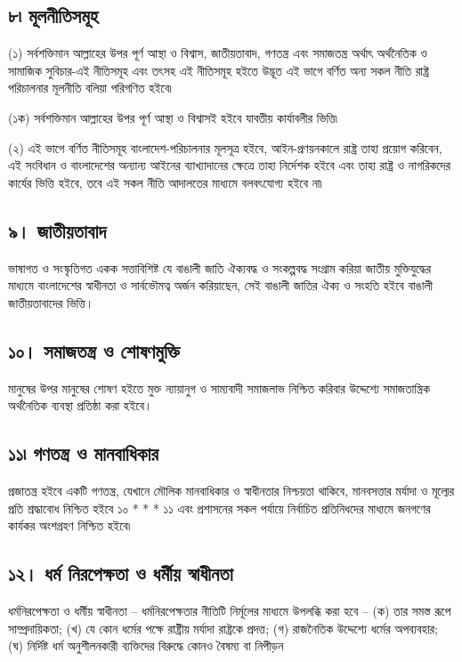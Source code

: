 \documentclass[11pt]{article}
\begin{document}
\subsection{৮৷ মূলনীতিসমূহ}
\label{sec:orgee61473}
(১) সর্বশক্তিমান আল্লাহের উপর পূর্ণ আস্থা ও বিশ্বাস, জাতীয়তাবাদ, গণতন্ত্র এবং
    সমাজতন্ত্র অর্থাৎ অর্থনৈতিক ও সামাজিক সুবিচার-এই নীতিসমূহ এবং তৎসহ এই
    নীতিসমূহ হইতে উদ্ভূত এই ভাগে বর্ণিত অন্য সকল নীতি রাষ্ট্র পরিচালনার মূলনীতি
    বলিয়া পরিগণিত হইবে৷

(১ক) সর্বশক্তিমান আল্লাহের উপর পূর্ণ আস্থা ও বিশ্বাসই হইবে যাবতীয় কার্যাবলীর
ভিত্তি৷

(২) এই ভাগে বর্ণিত নীতিসমূহ বাংলাদেশ-পরিচালনার মূলসূত্র হইবে, আইন-প্রণয়নকালে
    রাষ্ট্র তাহা প্রয়োগ করিবেন, এই সংবিধান ও বাংলাদেশের অন্যান্য আইনের
    ব্যাখ্যাদানের ক্ষেত্রে তাহা নির্দেশক হইবে এবং তাহা রাষ্ট্র ও নাগরিকদের কার্যের
    ভিত্তি হইবে, তবে এই সকল নীতি আদালতের মাধ্যমে বলবৎযোগ্য হইবে না৷

\subsection{৯। জাতীয়তাবাদ}
\label{sec:org129570f}
ভাষাগত ও সংস্কৃতিগত একক সত্তাবিশিষ্ট যে বাঙালী জাতি ঐক্যবদ্ধ ও সংকল্পবদ্ধ
সংগ্রাম করিয়া জাতীয় মুক্তিযুদ্ধের মাধ্যমে বাংলাদেশের স্বাধীনতা ও সার্বভৌমত্ব
অর্জন করিয়াছেন, সেই বাঙালী জাতির ঐক্য ও সংহতি হইবে বাঙালী জাতীয়তাবাদের
ভিত্তি।

\subsection{১০। সমাজতন্ত্র ও শোষণমুক্তি}
\label{sec:orgd1686b5}
মানুষের উপর মানুষের শোষণ হইতে মুক্ত ন্যায়ানুগ ও সাম্যবাদী সমাজলাভ নিশ্চিত
করিবার উদ্দেশ্যে সমাজতান্ত্রিক অর্থনৈতিক ব্যবস্থা প্রতিষ্ঠা করা হইবে।

\subsection{১১৷ গণতন্ত্র ও মানবাধিকার}
\label{sec:orgbdef7cc}
 প্রজাতন্ত্র হইবে একটি গণতন্ত্র, যেখানে মৌলিক মানবাধিকার ও স্বাধীনতার
নিশ্চয়তা থাকিবে, মানবসত্তার মর্যাদা ও মূল্যের প্রতি শ্রদ্ধাবোধ নিশ্চিত হইবে
১০ * * * ১১ এবং প্রশাসনের সকল পর্যায়ে নির্বাচিত প্রতিনিধদের মাধ্যমে জনগণের
কার্যকর অংশগ্রহণ নিশ্চিত হইবে৷

\subsection{১২। ধর্ম নিরপেক্ষতা ও ধর্মীয় স্বাধীনতা}
\label{sec:org63510c2}
ধর্মনিরপেক্ষতা ও ধর্মীয় স্বাধীনতা – ধর্মনিরপেক্ষতার নীতিটি নির্মূলের মাধ্যমে উপলব্ধি করা হবে –
(ক) তার সমস্ত রূপে সাম্প্রদায়িকতা;
(খ) যে কোন ধর্মের পক্ষে রাষ্ট্রীয় মর্যাদা রাষ্ট্রকে প্রদত্ত;
(গ) রাজনৈতিক উদ্দেশ্যে ধর্মের অপব্যবহার;
(ঘ) নির্দিষ্ট ধর্ম অনুশীলনকারী ব্যক্তিদের বিরুদ্ধে কোনও বৈষম্য বা নিপীড়ন
\end{document}
